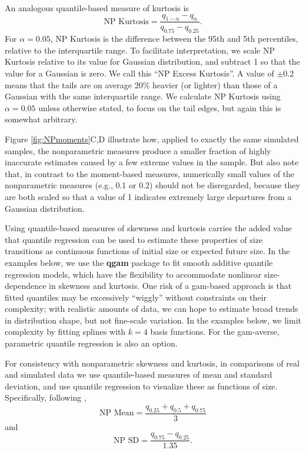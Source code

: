 \documentclass[12pt]{article}
\newcounter{box}
\newcommand{\be}{\begin{equation}}
\newcommand{\ee}{\end{equation}}
\begin{document}
An analogous quantile-based measure of kurtosis \citep{jones-etal-1994} is 
\be
\mbox{NP Kurtosis}  = \frac{q_{1-\alpha} - q_{\alpha}}{q_{0.75} - q_{0.25}}.
\label{eqn:NPkurt}
\ee
For $\alpha=0.05$, NP Kurtosis is the difference between the 95th and 5th percentiles, relative to the interquartile range. 
To facilitate interpretation, we scale NP Kurtosis relative to its value for Gaussian distribution, and subtract 1 so that the value for a Gaussian is zero. 
We call this ``NP Excess Kurtosis''. 
A value of $\pm 0.2$ means that the tails are on average 20\% heavier (or lighter) than those of a Gaussian with the same interquartile range. 
We calculate NP Kurtosis using $\alpha=0.05$ unless otherwise stated, to focus on the tail edges, but again this is somewhat arbitrary. 

Figure \ref{fig:NPmoments}C,D illustrate how, applied to exactly the same simulated samples, the nonparametric measures produce a smaller fraction of highly inaccurate estimates caused by a few extreme values in the sample. 
But also note that, in contrast to the moment-based measures, numerically small values of the nonparametric measures (e.g., 0.1 or 0.2) should not be disregarded, because they are both scaled so that a value of 1 indicates extremely large departures from a Gaussian distribution. 

Using quantile-based measures of skewness and kurtosis carries the added value that quantile regression can be used to estimate these properties of size transitions as continuous functions of initial size or expected future size. 
In the examples below, we use the \textbf{qgam} package \citep{fasiolo2020qgam} to fit smooth additive quantile regression models, which have the flexibility to accommodate nonlinear size-dependence in skewness and kurtosis. 
One risk of a gam-based approach is that fitted quantiles may be excessively ``wiggly'' without constraints on their complexity; with realistic amounts of data, we can hope to estimate broad trends in distribution shape, but not fine-scale variation.  
In the examples below, we limit complexity by fitting splines with $k=4$ basis functions. 
For the gam-averse, parametric quantile regression is also an option. 

For consistency with nonparametric skewness and kurtosis, in comparisons of real and simulated data we use quantile-based measures of mean and standard deviation, and use quantile regression to visualize these as functions of size. 
Specifically, following \cite{wan2014estimating},
\be
\mbox{NP Mean}  = \frac{q_{0.25} + q_{0.5} + q_{0.75}}{3}
\label{eqn:NPmean}
\ee
and
\be
\mbox{NP SD}  = \frac{q_{0.75} - q_{0.25}}{1.35}.
\label{eqn:NPsd}
\ee
\end{document}
